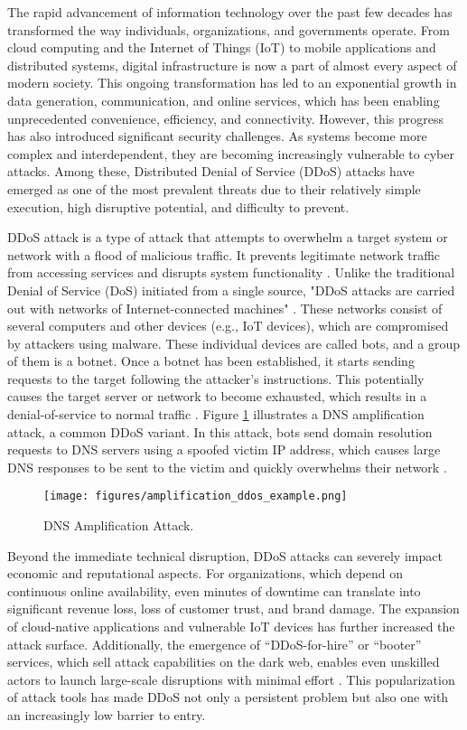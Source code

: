 The rapid advancement of information technology over the past few decades has transformed the way individuals, organizations, and governments operate. From cloud computing and the Internet of Things (IoT) to mobile applications and distributed systems, digital infrastructure is now a part of almost every aspect of modern society. This ongoing transformation has led to an exponential growth in data generation, communication, and online services, which has been enabling unprecedented convenience, efficiency, and connectivity. However, this progress has also introduced significant security challenges. As systems become more complex and interdependent, they are becoming increasingly vulnerable to cyber attacks. Among these, Distributed Denial of Service (DDoS) attacks have emerged as one of the most prevalent threats due to their relatively simple execution, high disruptive potential, and difficulty to prevent.

DDoS attack is a type of attack that attempts to overwhelm a target system or network with a flood of malicious traffic. It prevents legitimate network traffic from accessing services and disrupts system functionality \citep{886455}. Unlike the traditional Denial of Service (DoS) initiated from a single source, "DDoS attacks are carried out with networks of Internet-connected machines" \citep{cloudflare-ddos-attack}. These networks consist of several computers and other devices (e.g., IoT devices), which are compromised by attackers using malware. These individual devices are called bots, and a group of them is a botnet. Once a botnet has been established, it starts sending requests to the target following the attacker's instructions. This potentially causes the target server or network to become exhausted, which results in a denial-of-service to normal traffic \citep{cloudflare-ddos-attack}. Figure \ref{fig:amplification_ddos_example} illustrates a DNS amplification attack, a common DDoS variant. In this attack, bots send domain resolution requests to DNS servers using a spoofed victim IP address, which causes large DNS responses to be sent to the victim and quickly overwhelms their network \citep{cloudflare-ddos-attack}.

\begin{figure}[h]
    \centering
    \texttt{[image: figures/amplification\_ddos\_example.png]}
    \caption{DNS Amplification Attack.}
    \label{fig:amplification_ddos_example}
\end{figure}

Beyond the immediate technical disruption, DDoS attacks can severely impact economic and reputational aspects. For organizations, which depend on continuous online availability, even minutes of downtime can translate into significant revenue loss, loss of customer trust, and brand damage. The expansion of cloud-native applications and vulnerable IoT devices has further increased the attack surface. Additionally, the emergence of “DDoS-for-hire” or “booter” services, which sell attack capabilities on the dark web, enables even unskilled actors to launch large-scale disruptions with minimal effort \citep{fbi-ddos}. This popularization of attack tools has made DDoS not only a persistent problem but also one with an increasingly low barrier to entry.

